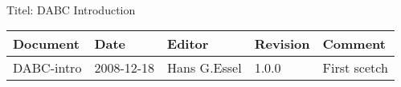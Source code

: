 \\Titel: DABC Introduction
\begin{table}[h]
\begin{tabular}{|p{2.0cm}|p{1.9cm}|p{3.2cm}|p{1.5cm}|p{5.8cm}|} \hline
Document   & Date        & Editor       & Revision & Comment \\
\hline DABC-intro & 2008-12-18 & Hans G.Essel & 1.0.0    & First
scetch \\ \hline
\end{tabular}
\end{table}
